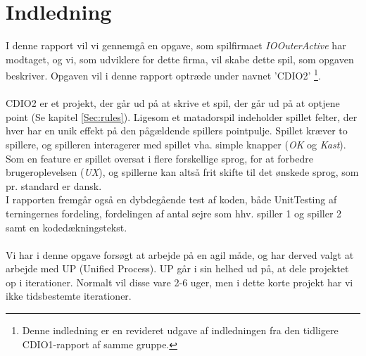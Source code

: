 \chapter{Indledning}
I denne rapport vil vi gennemgå en opgave, som spilfirmaet \textit{IOOuterActive} har modtaget, og vi, som udviklere for dette firma, vil skabe dette spil, som opgaven beskriver.
Opgaven vil i denne rapport optræde under navnet 'CDIO2' \footnote{Denne indledning er en revideret udgave af indledningen fra den tidligere CDIO1-rapport af samme gruppe.}.
\\\\CDIO2 er et projekt, der går ud på at skrive et spil, der går ud på at optjene point (Se kapitel \ref{Sec:rules}).
Ligesom et matadorspil indeholder spillet felter, der hver har en unik effekt på den pågældende spillers pointpulje.
Spillet kræver to spillere, og spilleren interagerer med spillet vha. simple knapper (\textit{OK} og \textit{Kast}).
Som en feature er spillet oversat i flere forskellige sprog, for at forbedre brugeroplevelsen (\textit{UX}), og spillerne kan altså frit skifte til det ønskede sprog, som pr. standard er dansk.
\\I rapporten fremgår også en dybdegående test af koden, både UnitTesting af terningernes fordeling, fordelingen af antal sejre som hhv. spiller 1 og spiller 2 samt en kodedækningstekst.
\\\\Vi har i denne opgave forsøgt at arbejde på en agil måde, og har derved valgt at arbejde med UP (Unified Process). 
UP går i sin helhed ud på, at dele projektet op i iterationer.
Normalt vil disse vare 2-6 uger, men i dette korte projekt har vi ikke tidsbestemte iterationer.
